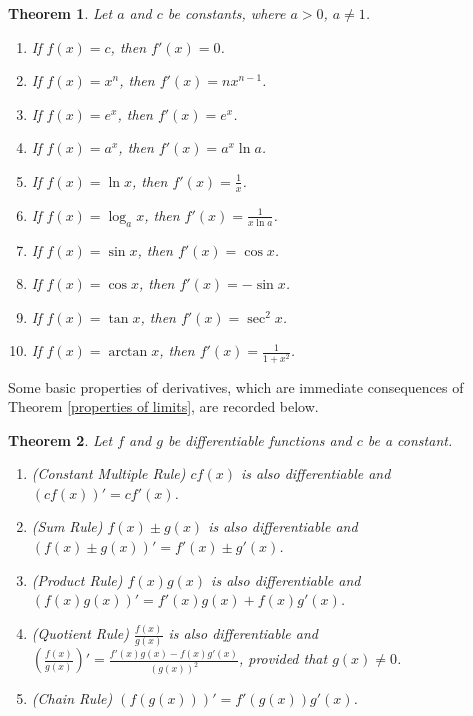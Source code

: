 \documentclass[12pt,letterpaper]{book}
\numberwithin{equation}{section}
\newtheorem{thm}{\textbf{Theorem}}[section]
\theoremstyle{definition}
\begin{document}
\begin{thm}\label{elementary functions} Let $a$ and $c$ be constants, where $a>0$, $a\neq 1$.
\begin{multicols}{2}
\begin{enumerate}
\item If $f(x)=c$, then $f'(x)=0$.
\item If $f(x)=x^n$, then $f'(x)=nx^{n-1}$.
\item If $f(x)=e^x$, then $f'(x)=e^x$.
\item If $f(x)=a^x$, then $f'(x)=a^x\ln a$.
\item If $f(x)=\ln x$, then $f'(x)=\frac{1}{x}$.
\item If $f(x)=\log_a x$, then $f'(x)=\frac{1}{x\ln a}$.
\item If $f(x)=\sin x$, then $f'(x)=\cos x$.
\item If $f(x)=\cos x$, then $f'(x)=-\sin x$.
\item If $f(x)=\tan x$, then $f'(x)=\sec^2 x$.
\item If $f(x)=\arctan x$, then $f'(x)=\frac{1}{1+x^2}$.
\end{enumerate}
\end{multicols}
\end{thm}

Some basic properties of derivatives, which are immediate consequences of Theorem \ref{properties of limits}, are recorded below.

\begin{thm}\label{basic properties} Let $f$ and $g$ be differentiable functions and $c$ be a constant.
\begin{enumerate}
\item (Constant Multiple Rule)  $cf(x)$ is also differentiable and $(cf(x))'=cf'(x)$.
\item (Sum Rule)  $f(x)\pm g(x)$ is also differentiable and $(f(x)\pm g(x))'=f'(x)\pm g'(x)$.
\item (Product Rule) $f(x)g(x)$ is also differentiable and $(f(x)g(x))'=f'(x)g(x)+f(x)g'(x)$.
\item (Quotient Rule) $\frac{f(x)}{g(x)}$ is also differentiable and $\displaystyle{\left(\frac{f(x)}{g(x)}\right)'=\frac{f'(x)g(x)-f(x)g'(x)}{(g(x))^2}}$, provided that $g(x)\neq 0$.
\item (Chain Rule) $(f(g(x)))'=f'(g(x))g'(x)$.
\end{enumerate}
\end{thm}
\end{document}
